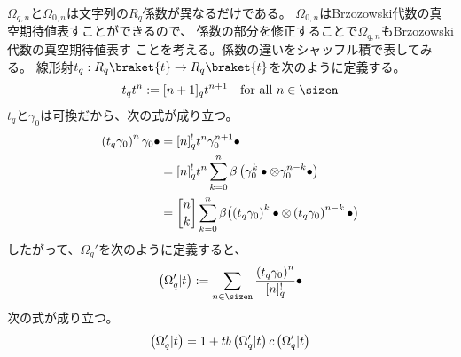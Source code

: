 {	$\Omega_{q,n}$と$\Omega_{0,n}$は文字列の$R_q$係数が異なるだけである。
	$\Omega_{0,n}$はBrzozowski代数の真空期待値表すことができるので、
	係数の部分を修正することで$\Omega_{q,n}$もBrzozowski代数の真空期待値表す
	ことを考える。係数の違いをシャッフル積で表してみる。
	線形射$t_q:R_q\braket{t}\to R_q\braket{t}$を次のように定義する。
	\begin{equation*}\begin{split}
		t_qt^n := [n+1]_qt^{n+1} \quad\text{for all } n\in\sizen
	\end{split}\end{equation*}
	$t_q$と$\gamma_0$は可換だから、次の式が成り立つ。
	\begin{equation*}\begin{split}
		\lr{t_q\gamma_0}^n\gamma_0\bullet 
		&= [n]_q^! t^n\gamma_0^{n+1}\bullet \\
		&= [n]_q^! t^n\sum_{k=0}^n 
			\beta\lr{\gamma_0^k\bullet\otimes\gamma_0^{n-k}\bullet} \\
		&= \qbinom{n}{k} \sum_{k=0}^n 
			\beta\glr{\lr{t_q\gamma_0}^k\bullet
			\otimes\lr{t_q\gamma_0}^{n-k}\bullet} \\
	\end{split}\end{equation*}
	したがって、$\Omega_q'$を次のように定義すると、
	\begin{equation*}\begin{split}
		\lr{\Omega_q'|t} := \sum_{n\in\sizen} 
		\frac{\lr{t_q\gamma_0}^n}{[n]_q^!}\bullet
	\end{split}\end{equation*}
	次の式が成り立つ。
	\begin{equation*}\begin{split}
		\left({\Omega_q'|t}\right) = 1 + tb\left({\Omega_q'|t}\right)c\left({\Omega_q'|t}\right)
	\end{split}\end{equation*}

}
